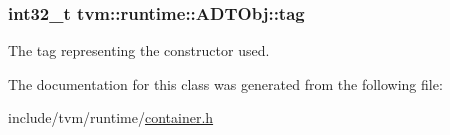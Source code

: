 \subsubsection[{\texorpdfstring{tag}{tag}}]{\setlength{\rightskip}{0pt plus 5cm}int32\+\_\+t tvm\+::runtime\+::\+A\+D\+T\+Obj\+::tag}\hypertarget{classtvm_1_1runtime_1_1ADTObj_a8c1835b988e836dd451a343bac7e402d}{}\label{classtvm_1_1runtime_1_1ADTObj_a8c1835b988e836dd451a343bac7e402d}


The tag representing the constructor used. 



The documentation for this class was generated from the following file\+:\begin{DoxyCompactItemize}
\item 
include/tvm/runtime/\hyperlink{runtime_2container_8h}{container.\+h}\end{DoxyCompactItemize}
